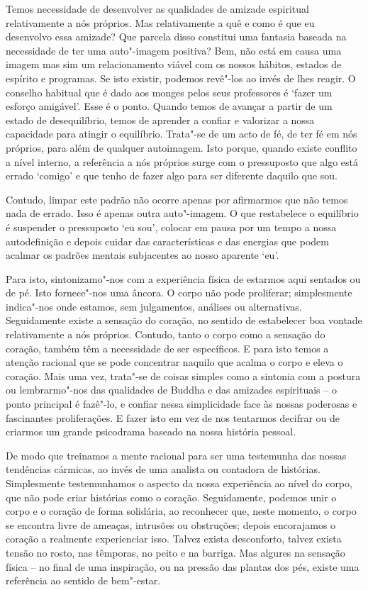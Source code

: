 Temos necessidade de desenvolver as qualidades de amizade espiritual relativamente a nós próprios. Mas relativamente a quê e como é que eu desenvolvo essa amizade? Que parcela disso constitui uma fantasia baseada na necessidade de ter uma auto"-imagem positiva? Bem, não está em causa uma imagem mas sim um relacionamento viável com os nossos hábitos, estados de espírito e programas. Se isto existir, podemos revê"-los ao invés de lhes reagir. O conselho habitual que é dado aos monges pelos seus professores é `fazer um esforço amigável'. Esse é o ponto. Quando temos de avançar a partir de um estado de desequilíbrio, temos de aprender a confiar e valorizar a nossa capacidade para atingir o equilíbrio. Trata"-se de um acto de fé, de ter fé em nós próprios, para além de qualquer autoimagem. Isto porque, quando existe conflito a nível interno, a referência a nós próprios surge com o pressuposto que algo está errado `comigo' e que tenho de fazer algo para ser diferente daquilo que sou.

Contudo, limpar este padrão não ocorre apenas por afirmarmos que não temos nada de errado. Isso é apenas outra auto"-imagem. O que restabelece o equilíbrio é suspender o pressuposto `eu sou', colocar em pausa por um tempo a nossa autodefinição e depois cuidar das características e das energias que podem acalmar os padrões mentais subjacentes ao nosso aparente `eu'.

Para isto, sintonizamo"-nos com a experiência física de estarmos aqui sentados ou de pé. Isto fornece"-nos uma âncora. O corpo não pode proliferar; simplesmente indica"-nos onde estamos, sem julgamentos, análises ou alternativas. Seguidamente existe a sensação do coração, no sentido de estabelecer boa vontade relativamente a nós próprios. Contudo, tanto o corpo como a sensação do coração, também têm a necessidade de ser específicos. E para isto temos a atenção racional que se pode concentrar naquilo que acalma o corpo e eleva o coração. Mais uma vez, trata"-se de coisas simples como a sintonia com a postura ou lembrarmo"-nos das qualidades de Buddha e das amizades espirituais -- o ponto principal é fazê"-lo, e confiar nessa simplicidade face às nossas poderosas e fascinantes proliferações. E fazer isto em vez de nos tentarmos decifrar ou de criarmos um grande psicodrama baseado na nossa história pessoal.

De modo que treinamos a mente racional para ser uma testemunha das nossas tendências cármicas, ao invés de uma analista ou contadora de histórias. Simplesmente testemunhamos o aspecto da nossa experiência ao nível do corpo, que não pode criar histórias como o coração. Seguidamente, podemos unir o corpo e o coração de forma solidária, ao reconhecer que, neste momento, o corpo se encontra livre de ameaças, intrusões ou obstruções; depois encorajamos o coração a realmente experienciar isso. Talvez exista desconforto, talvez exista tensão no rosto, nas têmporas, no peito e na barriga. Mas algures na sensação física -- no final de uma inspiração, ou na pressão das plantas dos pés, existe uma referência ao sentido de bem"-estar.

